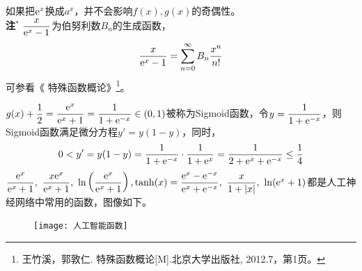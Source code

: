 \begin{enumerate}[label={【\textbf{例\thechapter.\arabic*}】},
 leftmargin=\inteval{\myenumleftmargin}pt,
 itemsep=\inteval{\myenumitempsep}pt,
 itemindent=\inteval{\myenumitemindent}pt]
如果把$ \mathrm{e}^x $换成$ a^x $，并不会影响$ f(x),g(x) $的奇偶性。\\
\textbf{注}$ ^* $ $ \dfrac{x}{\mathrm{e}^x-1} $为伯努利数$ B_n $的生成函数，
\begin{gather*}
    \dfrac{x}{\mathrm{e}^x-1}=\sum\limits_{n=0}^{\infty}B_n\dfrac{x^n}{n!} 
\end{gather*}
可参看《 特殊函数概论》\footnote{
    王竹溪，郭敦仁. 特殊函数概论[M].北京大学出版社, 2012.7，第1页。}。

$ g(x)+\dfrac{1}{2}=\dfrac{\mathrm{e}^x}{\mathrm{e}^x+1}=\dfrac{1}{1+\mathrm{e}^{-x}}
\in (0,1) $被称为Sigmoid函数，令$ y=\dfrac{1}{1+\mathrm{e}^{-x}} $，则
Sigmoid函数满足微分方程$ y'=y(1-y) $，同时，
\begin{gather*}
    0<y'=y(1-y)=\dfrac{1}{1+\mathrm{e}^{-x}}\cdot\dfrac{1}{1+\mathrm{e}^{x}}
    =\dfrac{1}{2+\mathrm{e}^{x}+\mathrm{e}^{-x}}\leq\dfrac{1}{4}
\end{gather*}
$ \dfrac{\e^x}{\e^x+1},\ \dfrac{x\e^x}{\e^x+1},\ \ln\left(\dfrac{\e^x}{\e^x+1}\right),
 \tanh(x)=\dfrac{\e^x-\e^{-x}}{\e^x+\e^{-x}},\ \dfrac{x}{1+|x|},\ 
\ln(\e^x+1) $都是人工神经网络中常用的函数，图像如下。
\begin{figure}[!htbp]   %
    \centering
    \texttt{[image: 人工智能函数]}
\end{figure} 


\end{enumerate}
